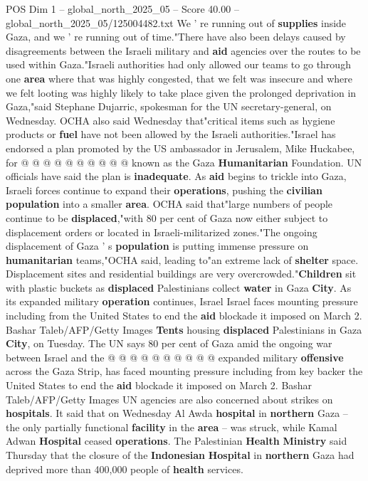 \begin{textsample}{POS Dim 1 – global\_north\_2025\_05 – Score 40.00 – global\_north\_2025\_05/125004482.txt}
We ' re running out of \textbf{supplies} inside Gaza, and we ' re running out of time."There have also been delays caused by disagreements between the Israeli military and \textbf{aid} agencies over the routes to be used within Gaza."Israeli authorities had only allowed our teams to go through one \textbf{area} where that was highly congested, that we felt was insecure and where we felt looting was highly likely to take place given the prolonged deprivation in Gaza,"said Stephane Dujarric, spokesman for the UN secretary-general, on Wednesday.
OCHA also said Wednesday that"critical items such as hygiene products or \textbf{fuel} have not been allowed by the Israeli authorities."Israel has endorsed a plan promoted by the US ambassador in Jerusalem, Mike Huckabee, for @ @ @ @ @ @ @ @ @ @ known as the Gaza \textbf{Humanitarian} Foundation.
UN officials have said the plan is \textbf{inadequate}.
As \textbf{aid} begins to trickle into Gaza, Israeli forces continue to expand their \textbf{operations}, pushing the \textbf{civilian} \textbf{population} into a smaller \textbf{area}.
OCHA said that"large numbers of people continue to be \textbf{displaced},"with 80 per cent of Gaza now either subject to displacement orders or located in Israeli-militarized zones."The ongoing displacement of Gaza ' s \textbf{population} is putting immense pressure on \textbf{humanitarian} teams,"OCHA said, leading to"an extreme lack of \textbf{shelter} space.
Displacement sites and residential buildings are very overcrowded."\textbf{Children} sit with plastic buckets as \textbf{displaced} Palestinians collect \textbf{water} in Gaza \textbf{City}.
As its expanded military \textbf{operation} continues, Israel Israel faces mounting pressure including from the United States to end the \textbf{aid} blockade it imposed on March 2.
Bashar Taleb/AFP/Getty Images \textbf{Tents} housing \textbf{displaced} Palestinians in Gaza \textbf{City}, on Tuesday.
The UN says 80 per cent of Gaza amid the ongoing war between Israel and the @ @ @ @ @ @ @ @ @ @ expanded military \textbf{offensive} across the Gaza Strip, has faced mounting pressure including from key backer the United States to end the \textbf{aid} blockade it imposed on March 2.
Bashar Taleb/AFP/Getty Images UN agencies are also concerned about strikes on \textbf{hospitals}.
It said that on Wednesday Al Awda \textbf{hospital} in \textbf{northern} Gaza -- the only partially functional \textbf{facility} in the \textbf{area} -- was struck, while Kamal Adwan \textbf{Hospital} ceased \textbf{operations}.
The Palestinian \textbf{Health} \textbf{Ministry} said Thursday that the closure of the \textbf{Indonesian} \textbf{Hospital} in \textbf{northern} Gaza had deprived more than 400,000 people of \textbf{health} services.

\end{textsample}
